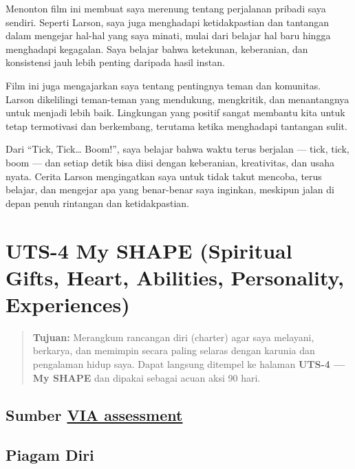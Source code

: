\documentclass[
  letterpaper,
  DIV=11,
  numbers=noendperiod]{scrreprt}
\begin{document}
Menonton film ini membuat saya merenung tentang perjalanan pribadi saya
sendiri. Seperti Larson, saya juga menghadapi ketidakpastian dan
tantangan dalam mengejar hal-hal yang saya minati, mulai dari belajar
hal baru hingga menghadapi kegagalan. Saya belajar bahwa ketekunan,
keberanian, dan konsistensi jauh lebih penting daripada hasil instan.

Film ini juga mengajarkan saya tentang pentingnya teman dan komunitas.
Larson dikelilingi teman-teman yang mendukung, mengkritik, dan
menantangnya untuk menjadi lebih baik. Lingkungan yang positif sangat
membantu kita untuk tetap termotivasi dan berkembang, terutama ketika
menghadapi tantangan sulit.

Dari ``Tick, Tick\ldots{} Boom!'', saya belajar bahwa waktu terus
berjalan --- tick, tick, boom --- dan setiap detik bisa diisi dengan
keberanian, kreativitas, dan usaha nyata. Cerita Larson mengingatkan
saya untuk tidak takut mencoba, terus belajar, dan mengejar apa yang
benar-benar saya inginkan, meskipun jalan di depan penuh rintangan dan
ketidakpastian.


\chapter{UTS-4 My SHAPE (Spiritual Gifts, Heart, Abilities, Personality,
Experiences)}\label{uts-4-my-shape-spiritual-gifts-heart-abilities-personality-experiences}

\begin{quote}
\textbf{Tujuan:} Merangkum rancangan diri (charter) agar saya melayani,
berkarya, dan memimpin secara paling selaras dengan karunia dan
pengalaman hidup saya. Dapat langsung ditempel ke halaman \textbf{UTS-4
--- My SHAPE} dan dipakai sebagai acuan aksi 90 hari.
\end{quote}

\section{\texorpdfstring{Sumber
\href{StrengthsProfile-Christopher-Richard.pdf}{VIA
assessment}}{Sumber VIA assessment}}\label{sumber-via-assessment}

\section{Piagam Diri}\label{piagam-diri}
\end{document}
